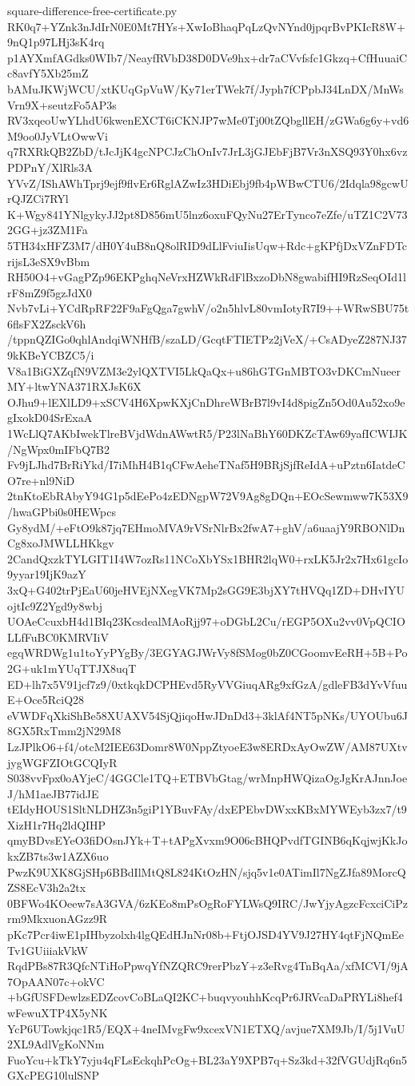 \documentclass[11pt]{article}
\theoremstyle{definition}
\theoremstyle{remark}
\begin{document}
\begin{filecontents*}[overwrite]{square-difference-free-certificate.py}
RK0q7+YZnk3nJdIrN0E0Mt7HYs+XwIoBhaqPqLzQvNYnd0jpqrBvPKIcR8W+9nQ1p97LHj3sK4rq
p1AYXmfAGdks0WIb7/NeayfRVbD38D0DVe9hx+dr7aCVvfsfc1Gkzq+CfHuuaiCc8avfY5Xb25mZ
bAMuJKWjWCU/xtKUqGpVuW/Ky71erTWek7f/Jyph7fCPpbJ34LnDX/MnWsVrn9X+seutzFo5AP3s
RV3xqeoUwYLhdU6kwenEXCT6iCKNJP7wMe0Tj00tZQbgllEH/zGWa6g6y+vd6M9oo0JyVLtOwwVi
q7RXRkQB2ZbD/tJcJjK4gcNPCJzChOnIv7JrL3jGJEbFjB7Vr3nXSQ93Y0hx6vzPDPnY/XlRls3A
YVvZ/IShAWhTprj9ejf9flvEr6RglAZwIz3HDiEbj9fb4pWBwCTU6/2Idqla98gcwUrQJZCi7RYl
K+Wgy841YNlgykyJJ2pt8D856mU5lnz6oxuFQyNu27ErTynco7eZfe/uTZ1C2V732GG+jz3ZM1Fa
5TH34xHFZ3M7/dH0Y4uB8nQ8olRID9dLlFviuIisUqw+Rdc+gKPfjDxVZnFDTcrijsL3eSX9vBbm
RH50O4+vGagPZp96EKPghqNeVrxHZWkRdFlBxzoDbN8gwabifHI9RzSeqOId1lrF8mZ9f5gzJdX0
Nvb7vLi+YCdRpRF22F9aFgQga7gwhV/o2n5hlvL80vmIotyR7I9++WRwSBU75t6flsFX2ZsckV6h
/tppnQZIGo0qhlAndqiWNHfB/szaLD/GcqtFTIETPz2jVeX/+CsADyeZ287NJ379kKBeYCBZC5/i
V8a1BiGXZqfN9VZM3e2ylQXTVI5LkQaQx+u86hGTGnMBTO3vDKCmNueerMY+ltwYNA371RXJsK6X
OJhu9+lEXlLD9+xSCV4H6XpwKXjCnDhreWBrB7l9vI4d8pigZn5Od0Au52xo9egIxokD04SrExaA
1WcLlQ7AKbIwekTlreBVjdWdnAWwtR5/P23lNaBhY60DKZcTAw69yafICWIJK/NgWpx0mIFbQ7B2
Fv9jLJhd7BrRiYkd/I7iMhH4B1qCFwAeheTNaf5H9BRjSjfReIdA+uPztn6IatdeCO7re+nl9NiD
2tnKtoEbRAbyY94G1p5dEePo4zEDNgpW72V9Ag8gDQn+EOcSewmww7K53X9/hwaGPbi0s0HEWpcs
Gy8ydM/+eFtO9k87jq7EHmoMVA9rVSrNlrBx2fwA7+ghV/a6uaajY9RBONlDnCg8xoJMWLLHKkgv
2CandQxzkTYLGIT1I4W7ozRs11NCoXbYSx1BHR2lqW0+rxLK5Jr2x7Hx61gcIo9yyar19IjK9azY
3xQ+G402trPjEaU60jeHVEjNXegVK7Mp2sGG9E3bjXY7tHVQq1ZD+DHvIYUojtIc9Z2Ygd9y8wbj
UOAeCcuxbH4d1BIq23KcsdealMAoRjj97+oDGbL2Cu/rEGP5OXu2vv0VpQCIOLLfFuBC0KMRVIiV
egqWRDWg1u1toYyPYgBy/3EGYAGJWrVy8fSMog0bZ0CGoomvEeRH+5B+Po2G+uk1mYUqTTJX8uqT
ED+lh7x5V91jcf7z9/0xtkqkDCPHEvd5RyVVGiuqARg9xfGzA/gdleFB3dYvVfuuE+Oce5RciQ28
eVWDFqXkiShBe58XUAXV54SjQjiqoHwJDnDd3+3klAf4NT5pNKs/UYOUbu6J8GX5RxTmm2jN29M8
LzJPlkO6+f4/otcM2IEE63Domr8W0NppZtyoeE3w8ERDxAyOwZW/AM87UXtvjygWGFZIOtGCQIyR
S038vvFpx0oAYjeC/4GGCle1TQ+ETBVbGtag/wrMnpHWQizaOgJgKrAJnnJoeJ/hM1aeJB77idJE
tEIdyHOUS1SltNLDHZ3n5giP1YBuvFAy/dxEPEbvDWxxKBxMYWEyb3zx7/t9XizH1r7Hq2ldQIHP
qmyBDvsEYeO3fiDOsnJYk+T+tAPgXvxm9O06cBHQPvdfTGINB6qKqjwjKkJokxZB7ts3w1AZX6uo
PwzK9UXK8GjSHp6BBdIlMtQ8L824KtOzHN/sjq5v1e0ATimIl7NgZJfa89MorcQZS8EcV3h2a2tx
0BFWo4KOeew7sA3GVA/6zKEo8mPsOgRoFYLWsQ9IRC/JwYjyAgzcFcxciCiPzrm9MkxuonAGzz9R
pKc7Pcr4iwE1pIHbyzolxh4lgQEdHJnNr08b+FtjOJSD4YV9J27HY4qtFjNQmEeTv1GUiiiakVkW
RqdPBs87R3QfcNTiHoPpwqYfNZQRC9rerPbzY+z3eRvg4TnBqAa/xfMCVI/9jA7OpAAN07c+okVC
+bGfUSFDewlzsEDZcovCoBLaQI2KC+buqvyouhhKcqPr6JRVcaDaPRYLi8hef4wFewuXTP4X5yNK
YcP6UTowkjqc1R5/EQX+4neIMvgFw9xcexVN1ETXQ/avjue7XM9Jb/I/5j1VuU2XL9AdlVgKoNNm
FuoYcu+kTkY7yju4qFLsEckqhPcOg+BL23aY9XPB7q+Sz3kd+32fVGUdjRq6n5GXcPEG10lulSNP

\end{filecontents*}
\end{document}
